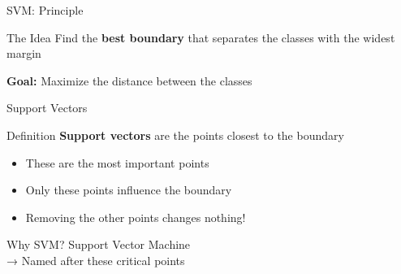\documentclass[aspectratio=169]{beamer}
\begin{document}
\begin{frame}{SVM: Principle}
\begin{block}{The Idea}
Find the \textbf{best boundary} that separates the classes with the widest margin
\end{block}

\vspace{0.3cm}
\begin{center}
\end{center}

\textbf{Goal:} Maximize the distance between the classes
\end{frame}

\begin{frame}{Support Vectors}
\begin{block}{Definition}
\textbf{Support vectors} are the points closest to the boundary
\end{block}

\vspace{0.3cm}
\begin{itemize}
    \item These are the most important points
    \item Only these points influence the boundary
    \item Removing the other points changes nothing!
\end{itemize}

\vspace{0.5cm}
\begin{alertblock}{Why SVM?}
Support Vector Machine\\
→ Named after these critical points
\end{alertblock}
\end{frame}
\end{document}
